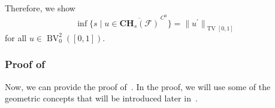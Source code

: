 \documentclass[12pt]{amsart}
\numberwithin{equation}{section}
\theoremstyle{remark}
\newcommand{\ql}[1]{\texttt{\color{cyan} QL: \footnotesize #1}}
\begin{document}
Therefore, we show
    \begin{equation}
        \inf \{ s \mid u \in \overline{\mathbf{CH}_s(\mathcal F)}^{\,C^0}\}
        =\|{u^\prime}\|_{\operatorname{TV}[0,1]}
    \end{equation}
for all $u\in \operatorname{BV}^2_0([0,1])$. 

\subsubsection{Proof of~}
Now, we can provide the proof of~. In the proof, we will use some of the geometric concepts that will be introduced later in~.
\end{document}
